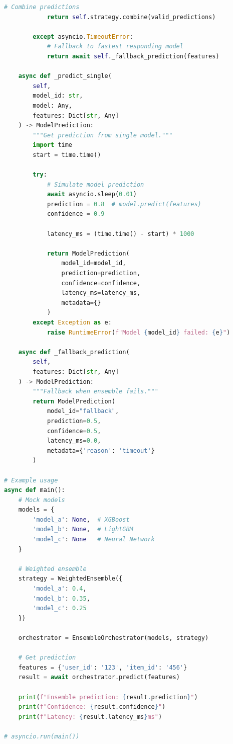 \begin{lstlisting}[language=Python, caption=Ensemble Model Integration]
            # Combine predictions
            return self.strategy.combine(valid_predictions)

        except asyncio.TimeoutError:
            # Fallback to fastest responding model
            return await self._fallback_prediction(features)

    async def _predict_single(
        self,
        model_id: str,
        model: Any,
        features: Dict[str, Any]
    ) -> ModelPrediction:
        """Get prediction from single model."""
        import time
        start = time.time()

        try:
            # Simulate model prediction
            await asyncio.sleep(0.01)
            prediction = 0.8  # model.predict(features)
            confidence = 0.9

            latency_ms = (time.time() - start) * 1000

            return ModelPrediction(
                model_id=model_id,
                prediction=prediction,
                confidence=confidence,
                latency_ms=latency_ms,
                metadata={}
            )
        except Exception as e:
            raise RuntimeError(f"Model {model_id} failed: {e}")

    async def _fallback_prediction(
        self,
        features: Dict[str, Any]
    ) -> ModelPrediction:
        """Fallback when ensemble fails."""
        return ModelPrediction(
            model_id="fallback",
            prediction=0.5,
            confidence=0.5,
            latency_ms=0.0,
            metadata={'reason': 'timeout'}
        )

# Example usage
async def main():
    # Mock models
    models = {
        'model_a': None,  # XGBoost
        'model_b': None,  # LightGBM
        'model_c': None   # Neural Network
    }

    # Weighted ensemble
    strategy = WeightedEnsemble({
        'model_a': 0.4,
        'model_b': 0.35,
        'model_c': 0.25
    })

    orchestrator = EnsembleOrchestrator(models, strategy)

    # Get prediction
    features = {'user_id': '123', 'item_id': '456'}
    result = await orchestrator.predict(features)

    print(f"Ensemble prediction: {result.prediction}")
    print(f"Confidence: {result.confidence}")
    print(f"Latency: {result.latency_ms}ms")

# asyncio.run(main())
\end{lstlisting}

